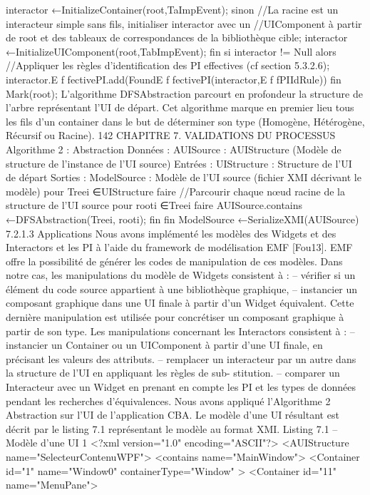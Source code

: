 \documentclass{article}
\begin{document}
interactor ←InitializeContainer(root,TaImpEvent);
sinon
//La racine est un interacteur simple sans ﬁls, initialiser interactor avec un //UIComponent
à partir de root et des tableaux de correspondances de la bibliothèque cible;
interactor ←InitializeUIComponent(root,TabImpEvent);
ﬁn
si interactor != Null alors
//Appliquer les règles d’identiﬁcation des PI effectives (cf section 5.3.2.6);
interactor.E f fectivePI.add(FoundE f fectivePI(interactor,E f fPIIdRule))
ﬁn
Mark(root);
L’algorithme DFSAbstraction parcourt en profondeur la structure de l’arbre représentant l’UI de
départ. Cet algorithme marque en premier lieu tous les ﬁls d’un container dans le but de déterminer
son type (Homogène, Hétérogène, Récursif ou Racine).
142
CHAPITRE 7. VALIDATIONS DU PROCESSUS
Algorithme 2 : Abstraction
Données : AUISource : AUIStructure (Modèle de structure de l’instance de l’UI source)
Entrées : UIStructure : Structure de l’UI de départ
Sorties : ModelSource : Modèle de l’UI source (ﬁchier XMI décrivant le modèle)
pour Treei ∈UIStructure faire
//Parcourir chaque nœud racine de la structure de l’UI source
pour rooti ∈Treei faire
AUISource.contains ←DFSAbstraction(Treei, rooti);
ﬁn
ﬁn
ModelSource ←SerializeXMI(AUISource)
7.2.1.3
Applications
Nous avons implémenté les modèles des Widgets et des Interactors et les PI à l’aide du framework
de modélisation EMF [Fou13]. EMF offre la possibilité de générer les codes de manipulation de ces
modèles. Dans notre cas, les manipulations du modèle de Widgets consistent à :
– vériﬁer si un élément du code source appartient à une bibliothèque graphique,
– instancier un composant graphique dans une UI ﬁnale à partir d’un Widget équivalent.
Cette dernière manipulation est utilisée pour concrétiser un composant graphique à partir de son type.
Les manipulations concernant les Interactors consistent à :
– instancier un Container ou un UIComponent à partir d’une UI ﬁnale, en précisant les valeurs
des attributs.
– remplacer un interacteur par un autre dans la structure de l’UI en appliquant les règles de sub-
stitution.
– comparer un Interacteur avec un Widget en prenant en compte les PI et les types de données
pendant les recherches d’équivalences.
Nous avons appliqué l’Algorithme 2 Abstraction sur l’UI de l’application CBA. Le modèle d’une
UI résultant est décrit par le listing 7.1 représentant le modèle au format XMI.
Listing 7.1 – Modèle d’une UI
1 <?xml version="1.0" encoding="ASCII"?>
<AUIStructure name="SelecteurContenuWPF">
<contains name="MainWindow">
<Container id="1" name="Window0" containerType="Window" >
<Container id="11" name="MenuPane">
\end{document}

